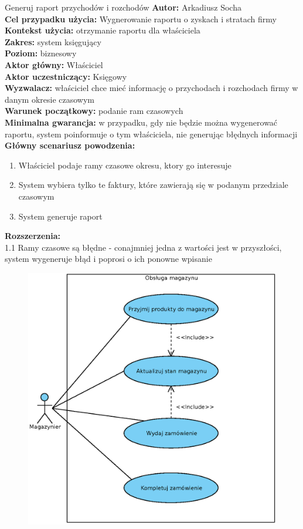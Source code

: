 \begin{usecase}{Generuj raport przychodów i rozchodów}
	\textbf{Autor:} Arkadiusz Socha\\
	\textbf{Cel przypadku użycia:} Wygnerowanie raportu o zyskach i stratach firmy \\
	\textbf{Kontekst użycia:} otrzymanie raportu dla właściciela  \\
	\textbf{Zakres:} system księgujący \\
	\textbf{Poziom:} biznesowy \\
	\textbf{Aktor główny:} Właściciel \\
	\textbf{Aktor uczestniczący:} Księgowy \\
	\textbf{Wyzwalacz:} właściciel chce mieć informację o przychodach i rozchodach firmy w danym okresie czasowym \\
	\textbf{Warunek początkowy:} podanie ram czasowych  \\
	\textbf{Minimalna gwarancja:} w przypadku, gdy nie będzie można wygenerować raportu, system poinformuje o tym właściciela, nie generując błędnych informacji \\
	\textbf{Główny scenariusz powodzenia:} 
		\begin{enumerate}
			\item Właściciel podaje ramy czasowe okresu, ktory go interesuje
			\item System wybiera tylko te faktury, które zawierają się w podanym przedziale czasowym
			\item System generuje raport
		\end{enumerate}
	\textbf{Rozszerzenia:} \\
	1.1 Ramy czasowe są błędne - conajmniej jedna z wartości jest w przyszłości, system wygeneruje błąd i poprosi o ich ponowne wpisanie
\end{usecase}

\begin{figure}[H]
	\centering
	\includegraphics[width=.8\textwidth]{img/UC/magazyn.eps}
\end{figure}

